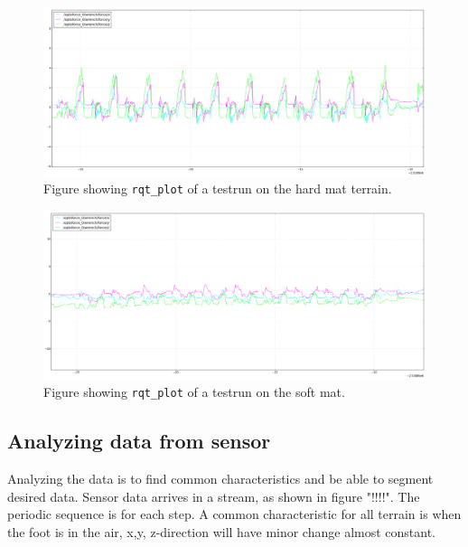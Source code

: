 \documentclass[USenglish]{ifimaster}  %
\begin{document}
\begin{figure}[h]
	\centering
	\includegraphics[width=\textwidth,height=\textheight,keepaspectratio]{Figures/mattebgraf}
	\caption{Figure showing \texttt{rqt\_plot} of a testrun on the hard mat terrain.}
	\label{fig:graphhm}
\end{figure}

\begin{figure}[h]
	\centering
	\includegraphics[width=\textwidth,height=\textheight,keepaspectratio]{Figures/mykmattegraf}
	\caption{Figure showing \texttt{rqt\_plot} of a testrun on the soft mat.}
	\label{fig:graphmm}
\end{figure}

\FloatBarrier



\subsection{Analyzing data from sensor}
Analyzing the data is to find common characteristics and be able to segment desired data. Sensor data arrives in a stream, as shown in figure "!!!!". The periodic sequence is for each step. A common characteristic for all terrain is when the foot is in the air, x,y, z-direction will have minor change almost constant.
\end{document}
